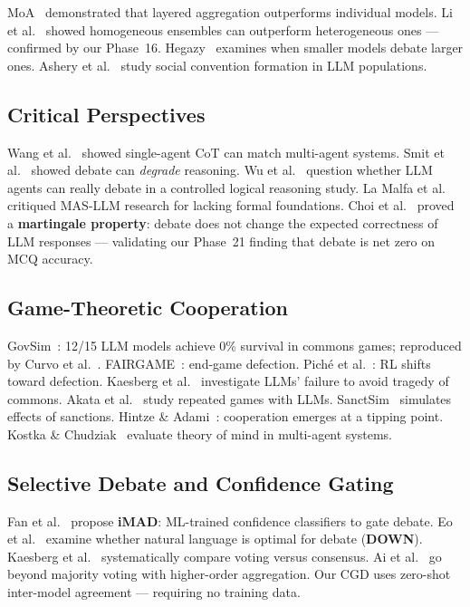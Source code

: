 \documentclass[11pt,a4paper]{article}
\begin{document}
MoA~\cite{togetherai2024moa} demonstrated that layered aggregation
outperforms individual models.  Li et al.~\cite{li2025selfmoa} showed
homogeneous ensembles can outperform heterogeneous ones — confirmed by
our Phase~16.  Hegazy~\cite{hegazy2024smaller} examines when smaller
models debate larger ones.  Ashery et al.~\cite{ashery2025social} study
social convention formation in LLM populations.

\subsection{Critical Perspectives}

Wang et al.~\cite{wang2024rethinking} showed single-agent CoT can
match multi-agent systems.  Smit et al.~\cite{smit2024mad} showed
debate can \emph{degrade} reasoning.  Wu et al.~\cite{wu2025debate}
question whether LLM agents can really debate in a controlled logical
reasoning study.  La Malfa et
al.~\cite{lamalfa2025limits} critiqued MAS-LLM research for lacking
formal foundations.  Choi et al.~\cite{choi2025debate} proved a
\textbf{martingale property}: debate does not change the expected
correctness of LLM responses — validating our Phase~21 finding that
debate is net zero on MCQ accuracy.

\subsection{Game-Theoretic Cooperation}

GovSim~\cite{piatti2024govsim}: 12/15 LLM models achieve 0\% survival
in commons games; reproduced by Curvo et al.~\cite{curvo2025govsim}.
FAIRGAME~\cite{buscemi2025fairgame}: end-game
defection.  Pich\'{e} et al.~\cite{piche2025robust}: RL shifts toward
defection.  Kaesberg et al.~\cite{kaesberg2025defection} investigate
LLMs' failure to avoid tragedy of commons.
Akata et al.~\cite{akata2023repeated} study repeated games with LLMs.
SanctSim~\cite{sanctsim2025} simulates effects of sanctions.
Hintze \& Adami~\cite{hintze2026cooperation}: cooperation emerges at a
tipping point.  Kostka \& Chudziak~\cite{kostka2026tom} evaluate
theory of mind in multi-agent systems.

\subsection{Selective Debate and Confidence Gating}

Fan et al.~\cite{fan2026imad} propose \textbf{iMAD}: ML-trained
confidence classifiers to gate debate.  Eo et al.~\cite{eo2025down}
examine whether natural language is optimal for debate
(\textbf{DOWN}).  Kaesberg et al.~\cite{kaesberg2025voting}
systematically compare voting versus consensus.  Ai et
al.~\cite{ai2025majority} go beyond majority voting with higher-order
aggregation.  Our CGD uses zero-shot inter-model agreement — requiring
no training data.
\end{document}
